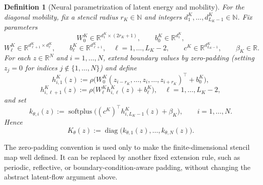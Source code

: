 \documentclass[11pt]{article}
\newtheorem{definition}{Definition}
\newcommand{\N}{\mathbb{N}}
\newcommand{\R}{\mathbb{R}}
\newcommand{\diag}{\operatorname{diag}}
\newcommand{\softplus}{\operatorname{softplus}}
\begin{document}
\begin{definition}[Neural parametrization of latent energy and mobility]
For the diagonal mobility, fix a stencil radius \(r_K\in \N\) and integers \(d_1^K,\dots,d_{L_K-1}^K\in \N\). Fix parameters
\begin{equation}\label{eq:K-params}
W_0^K\in \R^{d_1^K\times (2r_K+1)}, \qquad b_0^K\in \R^{d_1^K},
\end{equation}
\begin{equation*}
W_{\ell}^K\in \R^{d_{\ell+1}^K\times d_{\ell}^K}, \qquad b_{\ell}^K\in \R^{d_{\ell+1}^K}, \quad \ell=1,\dots,L_K-2,
\qquad c^K\in \R^{d_{L_K-1}^K}, \qquad \beta_K\in \R.
\end{equation*}
For each \(z\in\R^N\) and \(i=1,\dots,N\), extend boundary values by zero-padding (setting \(z_j=0\) for indices \(j\notin\{1,\dots,N\}\)) and define
\begin{equation}\label{eq:K-hidden}
h_{i,1}^K(z):=\rho\bigl(W_0^K(z_{i-r_K},\dots,z_i,\dots,z_{i+r_K})^\top+b_0^K\bigr),
\end{equation}
\begin{equation*}
h_{i,\ell+1}^K(z):=\rho\bigl(W_{\ell}^K h_{i,\ell}^K(z)+b_{\ell}^K\bigr), \quad \ell=1,\dots,L_K-2,
\end{equation*}
and set
\begin{equation}\label{eq:k-param}
k_{\theta,i}(z):=\softplus\bigl((c^K)^\top h_{i,L_K-1}^K(z)+\beta_K\bigr), \qquad i=1,\dots,N.
\end{equation}
Hence
\begin{equation}\label{eq:K-param}
K_{\theta}(z):=\diag\bigl(k_{\theta,1}(z),\dots,k_{\theta,N}(z)\bigr).
\end{equation}
\end{definition}

The zero-padding convention is used only to make the finite-dimensional stencil map well defined. It can be replaced by another fixed extension rule, such as periodic, reflective, or boundary-condition-aware padding, without changing the abstract latent-flow argument above.
\end{document}
